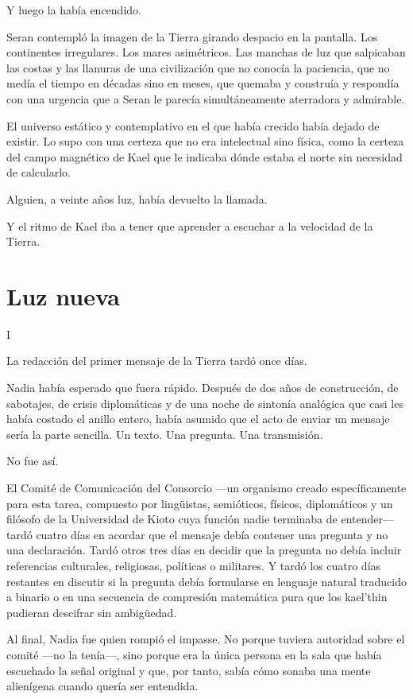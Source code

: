 \documentclass[11pt,a5paper,twoside]{book}
\begin{document}
Y luego la había encendido.

Seran contempló la imagen de la Tierra girando despacio en la pantalla. Los continentes irregulares. Los mares asimétricos. Las manchas de luz que salpicaban las costas y las llanuras de una civilización que no conocía la paciencia, que no medía el tiempo en décadas sino en meses, que quemaba y construía y respondía con una urgencia que a Seran le parecía simultáneamente aterradora y admirable.

El universo estático y contemplativo en el que había crecido había dejado de existir. Lo supo con una certeza que no era intelectual sino física, como la certeza del campo magnético de Kael que le indicaba dónde estaba el norte sin necesidad de calcularlo.

Alguien, a veinte años luz, había devuelto la llamada.

Y el ritmo de Kael iba a tener que aprender a escuchar a la velocidad de la Tierra.

\chapter{Luz nueva}

I

La redacción del primer mensaje de la Tierra tardó once días.

Nadia había esperado que fuera rápido. Después de dos años de construcción, de sabotajes, de crisis diplomáticas y de una noche de sintonía analógica que casi les había costado el anillo entero, había asumido que el acto de enviar un mensaje sería la parte sencilla. Un texto. Una pregunta. Una transmisión.

No fue así.

El Comité de Comunicación del Consorcio —un organismo creado específicamente para esta tarea, compuesto por lingüistas, semióticos, físicos, diplomáticos y un filósofo de la Universidad de Kioto cuya función nadie terminaba de entender— tardó cuatro días en acordar que el mensaje debía contener una pregunta y no una declaración. Tardó otros tres días en decidir que la pregunta no debía incluir referencias culturales, religiosas, políticas o militares. Y tardó los cuatro días restantes en discutir si la pregunta debía formularse en lenguaje natural traducido a binario o en una secuencia de compresión matemática pura que los kael'thin pudieran descifrar sin ambigüedad.

Al final, Nadia fue quien rompió el impasse. No porque tuviera autoridad sobre el comité —no la tenía—, sino porque era la única persona en la sala que había escuchado la señal original y que, por tanto, sabía cómo sonaba una mente alienígena cuando quería ser entendida.
\end{document}
